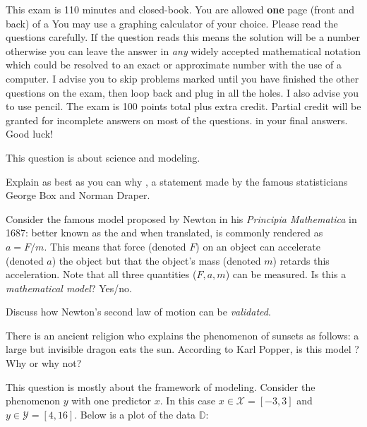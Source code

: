 \documentclass[12pt]{article}
\begin{document}
This exam is 110 minutes and closed-book. You are allowed \textbf{one} page (front and back) of a  You may use a graphing calculator of your choice. Please read the questions carefully. If the question reads  this means the solution will be a number otherwise you can leave the answer in \textit{any} widely accepted mathematical notation which could be resolved to an exact or approximate number with the use of a computer. I advise you to skip problems marked  until you have finished the other questions on the exam, then loop back and plug in all the holes. I also advise you to use pencil. The exam is 100 points total plus extra credit. Partial credit will be granted for incomplete answers on most of the questions.  in your final answers. Good luck!

\pagebreak

\problem This question is about science and modeling.

\benum

 Explain as best as you can why , a statement made by the famous statisticians George Box and Norman Draper. 

 Consider the famous model proposed by Newton in his \textit{Principia Mathematica} in 1687:  better known as the  and when translated, is commonly rendered as $a = F/m$. This means that force (denoted $F$) on an object can accelerate (denoted $a$) the object but that the object's mass (denoted $m$) retards this acceleration. Note that all three quantities ($F, a, m$) can be measured. Is this a \emph{mathematical model}? Yes/no.

 Discuss how Newton's second law of motion can be \emph{validated}.


 There is an ancient religion who explains the phenomenon of sunsets as follows: a large but invisible dragon eats the sun. According to Karl Popper, is this model ? Why or why not?

\eenum

\problem This question is mostly about the framework of modeling. Consider the phenomenon $y$ with one predictor $x$. In this case $x \in \mathcal{X} = [-3, 3]$ and $y \in \mathcal{Y} = [4,16]$.  Below is a plot of the data $\mathbb{D}$:
\end{document}
